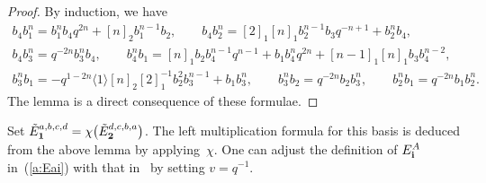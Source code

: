\documentclass[pdftex]{sigma}
\def\qmq#1{\langle #1 \rangle}
\begin{document}
\begin{proof}
 By induction, we have
\begin{gather*}
 {b_4 b_1^n} = {b_1^n b_4} q^{2 n}+[n]_2 {b_1^{n-1}b_2},\qquad
 {b_4 b_2^n} = [2]_1 [n]_1 {b_2^{n-1} b_3} q^{-n+1}+{b_2^n b_4},\\
 {b_4 b_3^n} = q^{-2 n} {b_3^n b_4},\qquad
 {b_4^n b_1} = [n]_1 {b_2 b_4^{n-1}} q^{n-1}+{b_1 b_4^n} q^{2 n}+[n-1]_1 [n]_1 {b_3 b_4^{n-2}},\\
 {b_3^n b_1} = -q^{1-2 n}\qmq{1} [n]_2 [2]_1^{-1} {b_2^2 b_3^{n-1}}+{b_1 b_3^n},\qquad
 {b_3^n b_2} = q^{-2 n} {b_2 b_3^n},\qquad
 {b_2^n b_1} = q^{-2 n} {b_1 b_2^n}.
 \end{gather*}
The lemma is a direct consequence of these formulae.
\end{proof}

Set ${\tilde E}_{\bf 1}^{a,b,c,d} = \chi\big({\tilde E}^{d,c,b,a}_{\bf 2}\big)$.
The left multiplication formula for this basis is deduced from
the above lemma by applying~$\chi$.
One can adjust the def\/inition of
$E^A_{\bf i}$ in~(\ref{a:Eai}) with that in~\cite{Xi} by setting $v=q^{-1}$.
\end{document}
